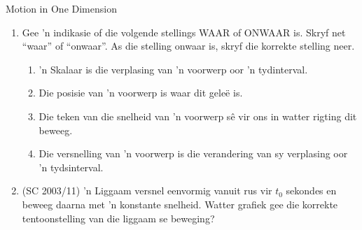 \begin{eocexercises}{Motion in One Dimension}
\begin{enumerate}[noitemsep, label=\textbf{\arabic*}. ]
    \item Gee 'n indikasie of die volgende stellings WAAR of ONWAAR is. Skryf net ``waar'' of ``onwaar''. As die stelling onwaar is, skryf die korrekte stelling neer.
    \begin{enumerate}[noitemsep, label=\textbf{\alph*}. ] 
        \item 'n Skalaar is die verplasing van 'n voorwerp oor 'n tydinterval.
        \item Die posisie van 'n voorwerp is waar dit gele\"e is.
        \item Die teken van die snelheid van 'n voorwerp s\^e vir ons in watter rigting dit beweeg.
        \item Die versnelling van 'n voorwerp is die verandering van sy verplasing oor 'n tydsinterval.
    \end{enumerate}
    
    \item (SC 2003/11) 'n Liggaam versnel eenvormig vanuit rus vir $t_0$ sekondes en beweeg daarna met 'n konstante snelheid. Watter grafiek gee die korrekte tentoonstelling van die liggaam se beweging?


\end{enumerate}
\end{eocexercises}
